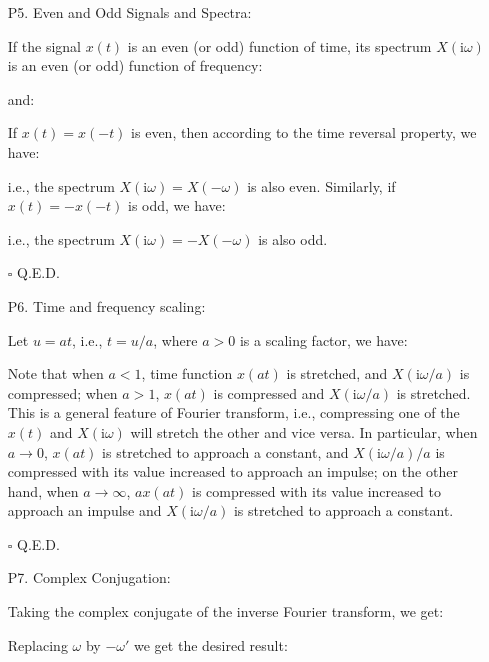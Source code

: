 \begin{itemize}
	\item[P5.] Even and Odd Signals and Spectra:
	
	If the signal $x(t)$ is an even (or odd) function of time, its spectrum $X(\mathrm{i}\omega)$ is an even (or odd) function of frequency:
	
	and:
	
	\begin{dem} If $x(t)=x(-t)$ is even, then according to the time reversal property, 
	we have:
	
	i.e., the spectrum $X(\mathrm{i}\omega)=X(-\omega)$ is also even. Similarly, if $x(t)=-x(-t)$ is odd, we have:
	
	i.e., the spectrum $X(\mathrm{i}\omega)=-X(-\omega)$ is also odd.
	\begin{flushright}
		$\square$  Q.E.D.
	\end{flushright}
	\end{dem}
	
	\item[P6.] Time and frequency scaling:
	
	\begin{dem}
	Let $u=at$, i.e., $t=u/a$, where $a>0$ is a scaling factor, we have:
	
	Note that when $a<1$, time function $x(at)$ is stretched, and $X(\mathrm{i}\omega/a)$ is compressed; when $a>1$, $x(at)$ is compressed and $X(\mathrm{i}\omega/a)$ is stretched.	This is a general feature of Fourier transform, i.e., compressing one of the $x(t)$ and $X(\mathrm{i}\omega)$ will stretch the other and vice versa. In particular, when $a\rightarrow 0$, $x(at)$ is stretched to approach a constant, and $X(\mathrm{i}\omega/a)/a$ is compressed with its value increased to approach an impulse; on the other	hand, when $a \rightarrow \infty$, $ax(at)$ is compressed with its value increased to approach an impulse and $X(\mathrm{i}\omega/a)$ is stretched to approach a constant.
	\begin{flushright}
		$\square$  Q.E.D.
	\end{flushright}
	\end{dem}
	
	\item[P7.] Complex Conjugation:
	
	
	\begin{dem} Taking the complex conjugate of the inverse Fourier transform, we get:
	
	Replacing $\omega$ by $-\omega'$ we get the desired result:
	

\end{dem}
\end{itemize}
